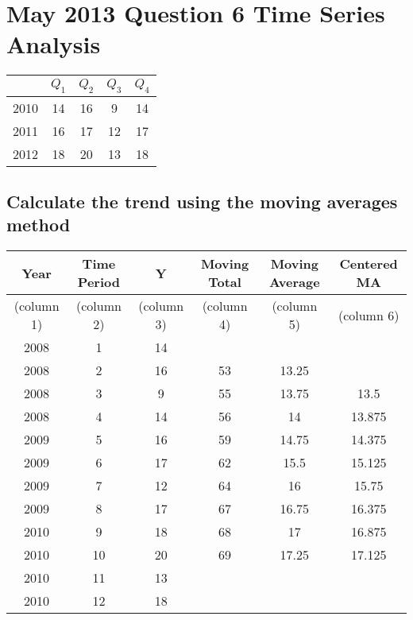 \documentclass[12pts]{article}
\begin{document}
\section*{May 2013 Question 6 Time Series Analysis}
\begin{center}
\begin{tabular}{|c|c|c|c|c|}
\hline  & $Q_1$ & $Q_2$ & $Q_3$ & $Q_4$ \\ 
\hline 2010 & 14 & 16 & 9 & 14 \\ 
\hline 2011 & 16 & 17 & 12 & 17 \\ 
\hline 2012 & 18 & 20 & 13 & 18 \\ 
\hline 
\end{tabular} 
\end{center}
\subsection*{Calculate the trend using the moving averages method}
\begin{center}
\begin{tabular}{|c|c|c|c|c|c|}
\hline
Year	&	Time Period	&	Y	&	Moving Total	&	Moving Average	&	Centered MA	\\	\hline
(column 1)	&	(column 2)	&	(column 3)	&	(column 4)	&	(column 5)	&	(column 6)	\\	\hline
2008	&	1	&	14	&		&		&		\\	\hline
2008	&	2	&	16	&	53	&	13.25	&		\\	\hline
2008	&	3	&	9	&	55	&	13.75	&	13.5	\\	\hline
2008	&	4	&	14	&	56	&	14	&	13.875	\\	\hline
2009	&	5	&	16	&	59	&	14.75	&	14.375	\\	\hline
2009	&	6	&	17	&	62	&	15.5	&	15.125	\\	\hline
2009	&	7	&	12	&	64	&	16	&	15.75	\\	\hline
2009	&	8	&	17	&	67	&	16.75	&	16.375	\\	\hline
2010	&	9	&	18	&	68	&	17	&	16.875	\\	\hline
2010	&	10	&	20	&	69	&	17.25	&	17.125	\\	\hline
2010	&	11	&	13	&		&		&		\\	\hline
2010	&	12	&	18	&		&		&		\\	\hline
\end{tabular} 
\end{center}
\end{document}
